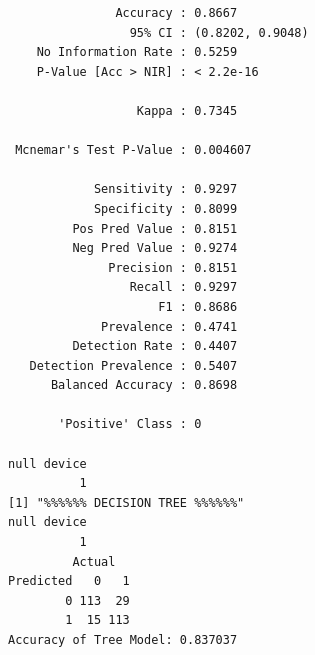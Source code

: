 \documentclass{article}
\begin{document}
\begin{thebibliography}{9}
\begin{verbatim}
               Accuracy : 0.8667          
                 95% CI : (0.8202, 0.9048)
    No Information Rate : 0.5259          
    P-Value [Acc > NIR] : < 2.2e-16       
                                          
                  Kappa : 0.7345          
                                          
 Mcnemar's Test P-Value : 0.004607        
                                          
            Sensitivity : 0.9297          
            Specificity : 0.8099          
         Pos Pred Value : 0.8151          
         Neg Pred Value : 0.9274          
              Precision : 0.8151          
                 Recall : 0.9297          
                     F1 : 0.8686          
             Prevalence : 0.4741          
         Detection Rate : 0.4407          
   Detection Prevalence : 0.5407          
      Balanced Accuracy : 0.8698          
                                          
       'Positive' Class : 0               
                                          
null device                                                                                                                     
          1 
[1] "%%%%%% DECISION TREE %%%%%%"
null device 
          1 
         Actual
Predicted   0   1
        0 113  29
        1  15 113
Accuracy of Tree Model: 0.837037 
  \end{verbatim}

\end{thebibliography}
\end{document}
